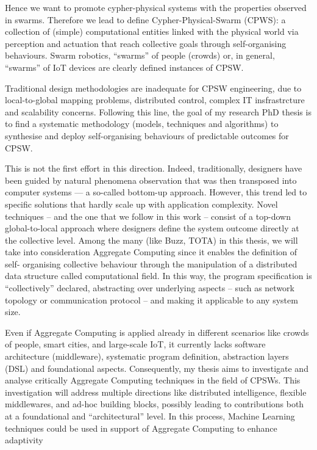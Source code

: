 \documentclass[11pt]{article}
\begin{document}
Hence we want to promote cypher-physical systems with the properties observed in swarms. Therefore we lead to define Cypher-Physical-Swarm (CPWS):
a collection of (simple) computational entities linked with the physical world via perception and actuation that reach collective goals through self-organising behaviours. Swarm robotics, ``swarms” of people (crowds) or, in general, ``swarms” of IoT devices are clearly defined instances of CPSW.

Traditional design methodologies are inadequate for CPSW engineering, due to local-to-global mapping problems, distributed control, complex IT insfrastrcture and scalability concerns.
Following this line, the goal of my research PhD thesis is to find a systematic methodology (models, techniques and algorithms)
to synthesise and deploy self-organising behaviours of predictable outcomes for CPSW.

This is not the first effort in this direction. Indeed, traditionally, designers have been guided
by natural phenomena observation that was then transposed into computer systems — a so-called
bottom-up approach. However, this trend led to specific solutions that hardly scale up with application complexity.
Novel techniques -- and the one that we follow in this work -- consist of a top-down global-to-local approach where designers define the system outcome directly at the collective level. Among the many (like Buzz, TOTA) in this thesis, we will take into consideration Aggregate Computing since it enables the definition of self-
organising collective behaviour through the manipulation of a distributed data structure called computational field. In this way, the program specification is “collectively” declared, abstracting over underlying aspects – such as network topology or communication protocol – and making it applicable to any system size. 

Even if Aggregate Computing is applied already in different scenarios like crowds of people, smart cities, and large-scale IoT, it currently lacks software architecture (middleware), systematic program definition, abstraction layers (DSL) and foundational aspects. Consequently, my thesis aims to investigate and analyse critically Aggregate
Computing techniques in the field of CPSWs. This investigation will address multiple directions
like distributed intelligence, flexible middlewares, and ad-hoc building blocks, possibly leading to
contributions both at a foundational and “architectural” level. In this process, Machine Learning techniques could be used in support of Aggregate Computing to enhance adaptivity
\end{document}
